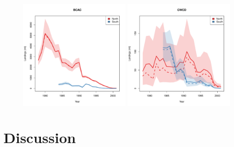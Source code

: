 \documentclass[12pt]{article}
\begin{document}
%
\begin{figure}[h!]
\centering
\includegraphics[width=0.49\textwidth]{./quickScripts/M4SPIG78to01SplitNo83/BCAC/yearBCAC.pdf}
\includegraphics[width=0.49\textwidth]{./quickScripts/M4SPIG78to01SplitNo83/CWCD/yearCWCD.pdf}
\end{figure}


%
%
\section{Discussion}\label{discussion}
%
%
\end{document}
